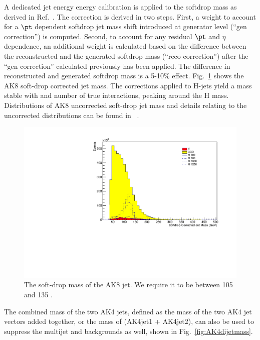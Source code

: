 A dedicated jet energy energy calibration is applied to the softdrop mass as derived in Ref.~\cite{CMS-AN-16-235}. The correction is derived in two steps. First, a weight to account for a $\pt$ dependent softdrop jet mass shift introduced at generator level (``gen correction'') is computed. Second, to account for any residual $\pt$ and $\eta$ dependence, an additional weight is calculated based on the difference between the reconstructed and the generated softdrop mass (``reco correction'') after the ``gen correction'' calculated previously has been applied. The difference in reconstructed and generated softdrop mass is a 5-10\% effect. 
Fig.~\ref{fig:AK8mass} shows the AK8 soft-drop corrected jet mass. The corrections applied to H-jets yield a mass stable with \pt and number of true interactions, peaking around the H mass. Distributions of AK8 uncorrected soft-drop jet mass and details relating to the uncorrected distributions can be found in ~\cite{CMS-PAS-B2G-16-026}.

\begin{figure}[thb!]
\begin{center}
\includegraphics[scale=0.5]{F5/shapejetmass.pdf}
\end{center}
\caption{The soft-drop mass of the AK8 jet. We require it to be between 105 and 135 \GeV.}
\label{fig:AK8mass}
\end{figure} 

The combined mass of the two AK4 jets, defined as the mass of the two AK4 jet vectors added together, or the mass of (AK4jet1 + AK4jet2), can also be used to suppress the multijet and \ttbar backgrounds as well, shown in Fig.~\ref{fig:AK4dijetmass}. 

